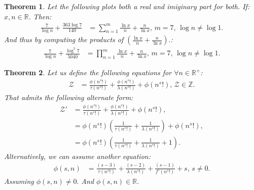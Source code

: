 \documentclass[10pt]{article}
\theoremstyle{plain}
\newtheorem{theorem}{Theorem}[section]
\theoremstyle{definition}
\theoremstyle{remark}
\begin{document}
\begin{theorem}
	Let the following plots both a real and imiginary part for both. If: $x, n \in \mathbb{R}.$ Then:
	\begin{align*}
		\frac{7}{\log n} + \frac{363 \log 7}{140} &= \sum_{n=1}^{m} \frac{\ln x}{n} + \frac{n}{\ln x}, \, m = 7, \, \log n \neq \log 1.
	\end{align*}
	And thus by computing the products of $(\frac{\ln x}{n} + \frac{n}{\ln x}).$:
	\begin{align*}
		\frac{7}{\log n} + \frac{\log^{7} 7}{5040} &= \prod_{n=1}^{m} \frac{\ln x}{n} + \frac{n}{\ln x}, \, m = 7, \, \log n \neq \log 1.
	\end{align*}
\end{theorem}

\begin{theorem}
	Let us define the following equations for $\forall n \in \mathbb{R}^{+}$:
	\begin{align*}
		\mathcal{Z} &= \frac{\phi(n^{s}!)}{\tau(n^{s}!)} + \frac{\phi(n^{s}!)}{\lambda(n^{s}!)} + \phi(n^{s}!), \, \mathcal{Z} \in \mathbb{Z}.
	\end{align*}
	That admits the following alternate form:
	\begin{align*}
		\mathcal{Z}' &= \frac{\phi(n^{s}!)}{\tau(n^{s}!)} + \frac{\phi(n^{s}!)}{\lambda(n^{s}!)} + \phi(n^{s}!),\\
		&= \phi(n^{s}!)(\frac{1}{\tau(n^{s}!)} + \frac{1}{\lambda(n^{s}!)}) + \phi(n^{s}!),\\
		&= \phi(n^{s}!)(\frac{1}{\tau(n^{s}!)} + \frac{1}{\lambda(n^{s}!)} + 1).
	\end{align*}
	Alternatively, we can assume another equation:
	\begin{align*}
		\phi(s, n) &= \frac{(s-3)}{\tau(n^{s}!)} + \frac{(s-2)}{\lambda(n^{s}!)} + \frac{(s-1)}{f'(n^{s}!)} + s, \, s \neq 0.
	\end{align*}
	Assuming $\phi(s, n) \neq 0.$ And $\phi(s, n) \in \mathbb{R}.$
\end{theorem}
\end{document}
